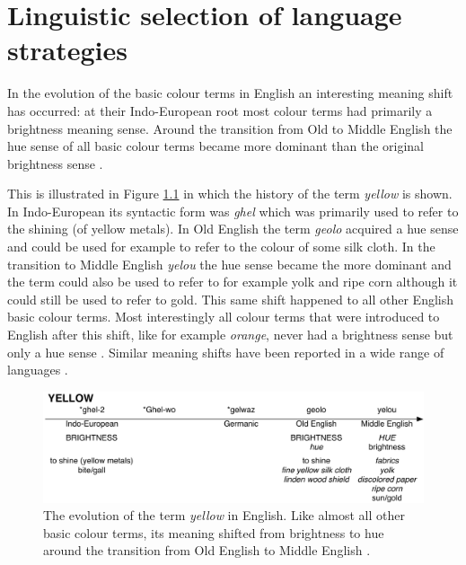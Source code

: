 \chapter{Linguistic selection of language strategies}
\label{s:strategy-selection}

\setcounter{figure}{2}

In the evolution of the basic colour terms in English an interesting
meaning shift has occurred: at their Indo-European root most colour
terms had primarily a brightness meaning sense. Around the transition
from Old to Middle English the hue sense of all basic colour terms
became more dominant than the original brightness sense
\citep{casson97shift}.

This is illustrated in Figure \ref{f:ls-history-yellow} in which the
history of the term \textit{yellow} is shown. In Indo-European its
syntactic form was \textit{ghel} which was primarily used to refer to the
shining (of yellow metals). In Old English the term \textit{geolo} acquired
a hue sense and could be used for example to refer to the colour of
some silk cloth. In the transition to Middle English \textit{yelou} the hue
sense became the more dominant and the term could also be used to
refer to for example yolk and ripe corn although it could still be
used to refer to gold. This same shift happened to all other English
basic colour terms. Most interestingly all colour terms that were
introduced to English after this shift, like for example \textit{orange},
never had a brightness sense but only a hue sense
\citep{casson97shift}. Similar meaning shifts have been reported in a
wide range of languages \citep{maclaury92brightness}.

\begin{figure}[htbp]
  \begin{center}
    \includegraphics[width=\textwidth]{./selection/figures/history-yellow.pdf}
   \caption[The evolution of the term \textit{yellow} in English]{The
     evolution of the term \textit{yellow} in English. Like almost all
     other basic colour terms, its meaning shifted from brightness to
     hue around the transition from Old English to Middle
     English \citep{casson97shift}.}
    \label{f:ls-history-yellow}
  \end{center}
\end{figure}

